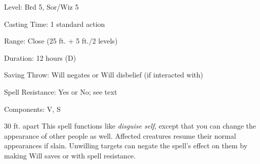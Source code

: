 
\begin{description*}
\item[Level:] Brd 5, Sor/Wiz 5
\item[Casting Time:] 1 standard action
\item[Range:] Close (25 ft. + 5 ft./2 levels)
\item[Duration:] 12 hours (D)
\item[Saving Throw:] Will negates or Will disbelief (if interacted with)
\item[Spell Resistance:] Yes or No; see text
\item[Components:] V, S
\end{description*}

30 ft. apart
This spell functions like \textit{disguise self}, except that you can change the
appearance of other people as well. Affected creatures resume their normal appearances
if slain.
Unwilling targets can negate the spell's effect on them by making Will saves or
with spell resistance.